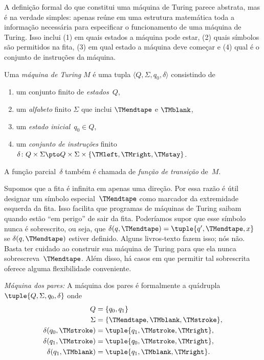 \documentclass[../../../include/open-logic-section]{subfiles}
\begin{document}

\begin{explain}
A definição formal do que constitui uma máquina de Turing parece
abstrata, mas é na verdade simples: apenas reúne em uma
estrutura matemática toda a informação necessária para especificar o
funcionamento de uma máquina de Turing. Isso inclui (1) em quais estados a
máquina pode estar, (2) quais símbolos são permitidos na fita, (3)
em qual estado a máquina deve começar e (4) qual é o conjunto de instruções
da máquina.
\end{explain}

\begin{defn}
Uma \emph{máquina de Turing} $M$ é uma tupla $\langle Q, \Sigma, q_0,
\delta\rangle$ consistindo de
\begin{enumerate}
\item um conjunto finito de \emph{estados}~$Q$,
\item um \emph{alfabeto} finito $\Sigma$ que inclui $\TMendtape$ e
  $\TMblank$,
\item um \emph{estado inicial}~$q_0 \in Q$,
\item um \emph{conjunto de instruções} finito~$\delta\colon Q \times \Sigma
  \pto Q \times \Sigma \times \{\TMleft, \TMright, \TMstay\}$.
\end{enumerate}
A função parcial~$\delta$ também é chamada de \emph{função de transição}
de~$M$.
\end{defn}

\begin{explain}
Supomos que a fita é infinita em apenas uma direção. Por essa
razão é útil designar um símbolo especial~$\TMendtape$ como
marcador da extremidade esquerda da fita. Isso facilita que programas de
máquinas de Turing saibam quando estão ``em perigo'' de sair da
fita. Poderíamos supor que esse símbolo nunca é sobrescrito, ou seja,
que $\delta(q,\TMendtape) = \tuple{q', \TMendtape, x}$ se
$\delta(q,\TMendtape)$ estiver definido. Alguns livros-texto fazem isso; nós não.
Basta ter cuidado ao construir sua máquina de Turing para que
ela nunca sobrescreva~$\TMendtape$. Além disso, há casos em que
permitir tal sobrescrita oferece alguma flexibilidade conveniente.
\end{explain}

\begin{ex}
\emph{Máquina dos pares:} A máquina dos pares é formalmente
a quádrupla $\tuple{Q, \Sigma, q_0, \delta}$ onde
\begin{align*}
Q & = \{ q_0, q_1 \} \\
\Sigma & = \{ \TMendtape, \TMblank, \TMstroke \}, \\
\delta(q_0, \TMstroke) & = \tuple{q_1, \TMstroke, \TMright},\\
\delta(q_1, \TMstroke) & = \tuple{q_0, \TMstroke, \TMright},\\
\delta(q_1, \TMblank)  & = \tuple{q_1, \TMblank, \TMright}.
\end{align*}
\end{ex}
\end{document}
